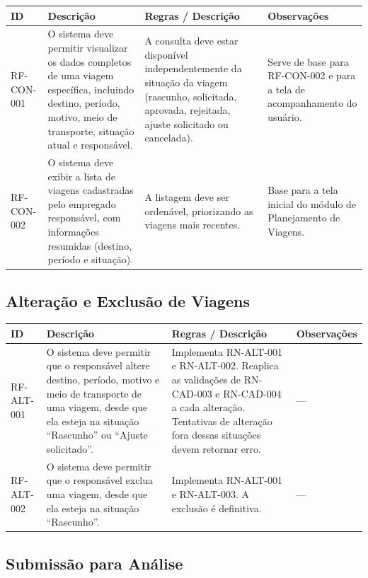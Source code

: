 \documentclass[12pt,article,oneside,a4paper]{abntex2}
\begin{document}
\begin{xltabular}{\textwidth}{|l|Y|Y|Y|}
\hline
{}
\textbf{ID} & \textbf{Descrição} & \textbf{Regras / Descrição} & \textbf{Observações} \\
\hline
\endhead
RF-CON-001 & O sistema deve permitir visualizar os dados completos de uma viagem específica, incluindo destino, período, motivo, meio de transporte, situação atual e responsável. & A consulta deve estar disponível independentemente da situação da viagem (rascunho, solicitada, aprovada, rejeitada, ajuste solicitado ou cancelada). & Serve de base para RF-CON-002 e para a tela de acompanhamento do usuário. \\
\hline
RF-CON-002 & O sistema deve exibir a lista de viagens cadastradas pelo empregado responsável, com informações resumidas (destino, período e situação). & A listagem deve ser ordenável, priorizando as viagens mais recentes. & Base para a tela inicial do módulo de Planejamento de Viagens. \\
\hline
\end{xltabular}

\bigskip

\subsection{Alteração e Exclusão de Viagens}

\begin{xltabular}{\textwidth}{|l|Y|Y|Y|}
\hline
{}
\textbf{ID} & \textbf{Descrição} & \textbf{Regras / Descrição} & \textbf{Observações} \\
\hline
\endhead
RF-ALT-001 & O sistema deve permitir que o responsável altere destino, período, motivo e meio de transporte de uma viagem, desde que ela esteja na situação ``Rascunho'' ou ``Ajuste solicitado''. & Implementa RN-ALT-001 e RN-ALT-002. Reaplica as validações de RN-CAD-003 e RN-CAD-004 a cada alteração. Tentativas de alteração fora dessas situações devem retornar erro. & --- \\
\hline
RF-ALT-002 & O sistema deve permitir que o responsável exclua uma viagem, desde que ela esteja na situação ``Rascunho''. & Implementa RN-ALT-001 e RN-ALT-003. A exclusão é definitiva. & --- \\
\hline
\end{xltabular}

\bigskip

\subsection{Submissão para Análise}
\end{document}
